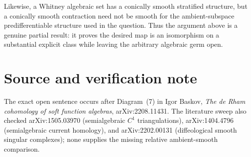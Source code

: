 \documentclass[11pt]{article}
\begin{document}
Likewise, a Whitney algebraic set has a conically smooth stratified structure,
but a conically smooth contraction need not be smooth for the ambient-subspace
predifferentiable structure used in the question.  Thus the argument above is
a genuine partial result: it proves the desired map is an isomorphism on a
substantial explicit class while leaving the arbitrary algebraic germ open.

\section*{Source and verification note}

The exact open sentence occurs after Diagram~(7) in Igor Baskov,
\emph{The de Rham cohomology of soft function algebras}, arXiv:2208.11431.
The literature sweep also checked
arXiv:1505.03970 (semialgebraic $C^1$ triangulations), arXiv:1404.4796
(semialgebraic current homology), and arXiv:2202.00131 (diffeological smooth
singular complexes); none supplies the missing relative ambient-smooth
comparison.
\end{document}
